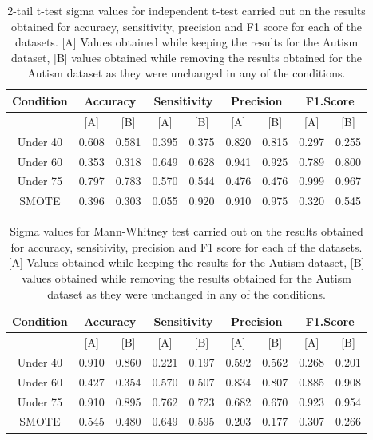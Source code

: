 \begin{table}[!htbp]
\centering
\begin{tabular}{*9c}
  \hline
  \rowcolor{LightCyan}
Condition &\multicolumn{2}{c}{Accuracy} &\multicolumn{2}{c}{Sensitivity} &\multicolumn{2}{c}{Precision}&\multicolumn{2}{c}{F1.Score}\\
  \hline
           & [A]  & [B]   & [A]   & [B]   & [A]   & [B]   & [A]   & [B] \\
 Under 40  &0.608 & 0.581 & 0.395 & 0.375 & 0.820 & 0.815 & 0.297 & 0.255 \\ 
  Under 60 &0.353 & 0.318 & 0.649 & 0.628 & 0.941 & 0.925 & 0.789 & 0.800 \\ 
  Under 75 &0.797 & 0.783 & 0.570 & 0.544 & 0.476 & 0.476 & 0.999 & 0.967 \\ 
  SMOTE    &0.396 & 0.303 & 0.055 & 0.920 & 0.910 & 0.975 & 0.320 & 0.545 \\
\hline
\end{tabular}
\caption{2-tail t-test sigma values for independent t-test carried out on the results obtained for accuracy, sensitivity, precision and F1 score for each of the datasets. [A] Values obtained while keeping the results for the Autism dataset, [B] values obtained while removing the results obtained for the Autism dataset as they were unchanged in any of the conditions.}
\label{tab: t-test}
\end{table}


\begin{table}[!htbp]
\centering
\begin{tabular}{*9c}
  \hline
  \rowcolor{LightCyan}
Condition &\multicolumn{2}{c}{Accuracy} &\multicolumn{2}{c}{Sensitivity} &\multicolumn{2}{c}{Precision}&\multicolumn{2}{c}{F1.Score}\\
  \hline
           & [A] & [B] & [A] & [B] & [A] & [B] & [A] & [B] \\
Under 40  &0.910& 0.860& 0.221 & 0.197 & 0.592 & 0.562 & 0.268 & 0.201 \\ 
  Under 60 &0.427& 0.354& 0.570 & 0.507 & 0.834 & 0.807 & 0.885 & 0.908 \\ 
  Under 75 &0.910&0.895 & 0.762 & 0.723 & 0.682 & 0.670 & 0.923 & 0.954 \\ 
  SMOTE &  0.545 & 0.480& 0.649 & 0.595  & 0.203 &0.177 & 0.307 & 0.266 \\
   \hline
\end{tabular}
\caption{Sigma values for Mann-Whitney test carried out on the results obtained for accuracy, sensitivity, precision and F1 score for each of the datasets. [A] Values obtained while keeping the results for the Autism dataset, [B] values obtained while removing the results obtained for the Autism dataset as they were unchanged in any of the conditions.}
\label{tab:MannWhiteney}
\end{table}
 

